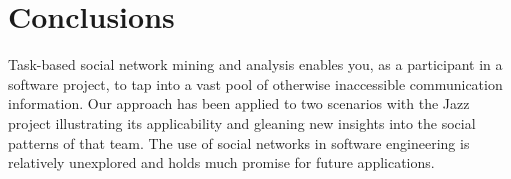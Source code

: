 % 
% 




\section{Conclusions}
Task-based social network mining and analysis enables you, as a participant in a
software project, to tap into a vast pool of otherwise inaccessible communication
information. Our approach has been applied to two scenarios with the Jazz project
illustrating its applicability and gleaning new insights into the social patterns
of that team. The use of social networks in software engineering is relatively
unexplored and holds much promise for future applications.

